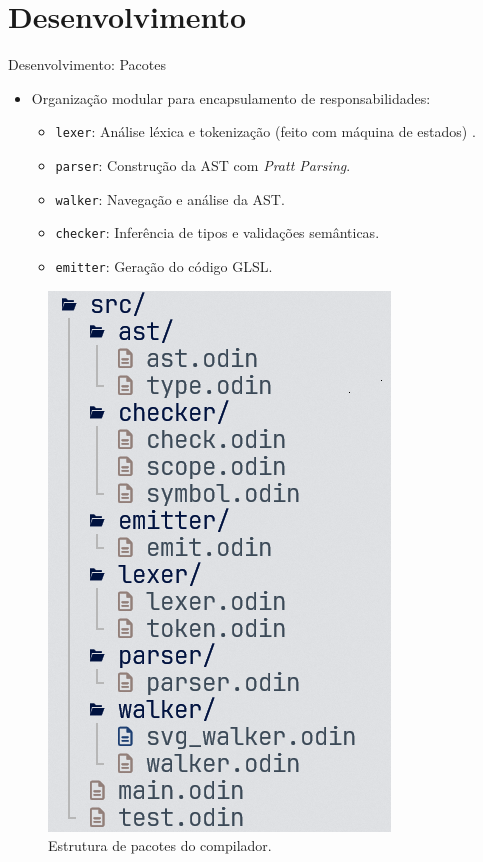 \section{Desenvolvimento}

\begin{frame}{Desenvolvimento: Pacotes}
    \begin{itemize}
        \item Organização modular para encapsulamento de responsabilidades:
        \begin{itemize}
            \item \texttt{lexer}: Análise léxica e tokenização (feito com máquina de estados) .
            \item \texttt{parser}: Construção da AST com \textit{Pratt Parsing}.
            \item \texttt{walker}: Navegação e análise da AST.
            \item \texttt{checker}: Inferência de tipos e validações semânticas.
            \item \texttt{emitter}: Geração do código GLSL.
        \end{itemize}
    \end{itemize}
    \begin{figure}
        \centering
        \includegraphics[scale=0.34]{./Imagens/package-structure.png}
        \caption{\small Estrutura de pacotes do compilador.}
    \end{figure}
\end{frame}


